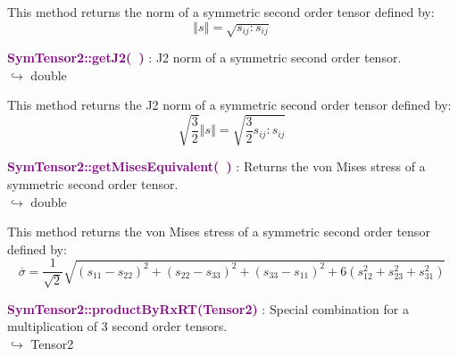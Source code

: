 This method returns the norm of a symmetric second order tensor defined by:
\begin{equation*}
\left\Vert s \right\Vert  = \sqrt {s_{ij}:s_{ij}}
\end{equation*}

\textcolor{purple}{\textbf{SymTensor2::getJ2(~)}}\label{SymTensor2::getJ2()} : J2 norm of a symmetric second order tensor.\\ \hspace*{5mm}$\hookrightarrow$ double

This method returns the J2 norm of a symmetric second order tensor defined by:
\begin{equation*}
\sqrt {\frac{3}{2}} \left\Vert s \right\Vert  = \sqrt {\frac{3}{2} s_{ij}:s_{ij}}
\end{equation*}

\textcolor{purple}{\textbf{SymTensor2::getMisesEquivalent(~)}}\label{SymTensor2::getMisesEquivalent()} : Returns the von Mises stress of a symmetric second order tensor.\\ \hspace*{5mm}$\hookrightarrow$ double

This method returns the von Mises stress of a symmetric second order tensor defined by:
\begin{equation*}
\overline{\sigma} = \frac {1}{\sqrt{2}}\sqrt{(s_{11}-s_{22})^2+(s_{22}-s_{33})^2+(s_{33}-s_{11})^2+6(s_{12}^2+s_{23}^2+s_{31}^2)}
\end{equation*}

\textcolor{purple}{\textbf{SymTensor2::productByRxRT(Tensor2)}}\label{SymTensor2::productByRxRT(Tensor2)} : Special combination for a multiplication of 3 second order tensors.\\ \hspace*{5mm}$\hookrightarrow$ Tensor2

